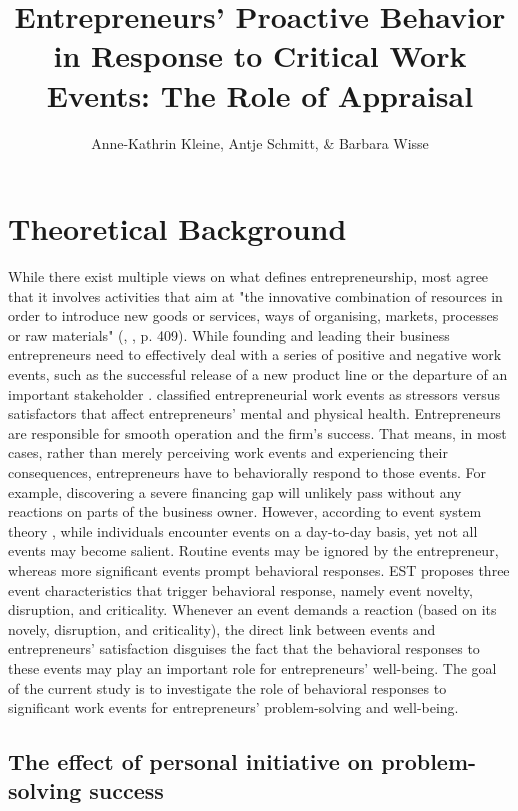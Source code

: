 \documentclass[man, 12pt, a4paper, noextraspace]{apa6}
\title{Entrepreneurs' Proactive Behavior in Response to Critical Work Events: The Role of Appraisal}
\author{Anne-Kathrin Kleine, Antje Schmitt, \& Barbara Wisse}
\affiliation{University of Groningen}
\begin{document}
\maketitle

\section{Theoretical Background}

While there exist multiple views on what defines entrepreneurship, most agree that it involves activities that aim at "the innovative combination of resources in order to introduce new goods or services, ways of organising, markets, processes or raw materials" (\citeauthor{Abreu2013}, \citeyear{Abreu2013}, p. 409).
While founding and leading their business entrepreneurs need to effectively deal with a series of positive and negative work events, such as the successful release of a new product line or the departure of an important stakeholder \parencite{Lechat2016, Schindehutte2006}.
\textcite{Lechat2016} classified entrepreneurial work events as stressors versus satisfactors that affect entrepreneurs' mental and physical health.
Entrepreneurs are responsible for smooth operation and the firm's success. 
That means, in most cases, rather than merely perceiving work events and experiencing their consequences, entrepreneurs have to behaviorally respond to those events.
For example, discovering a severe financing gap will unlikely pass without any reactions on parts of the business owner. 
However, according to event system theory \parencite[EST;][]{Morgeson2015}, while individuals encounter events on a day-to-day basis, yet not all events may become salient. 
Routine events may be ignored by the entrepreneur, whereas more significant events prompt behavioral responses.  
EST proposes three event characteristics that trigger behavioral response, namely event novelty, disruption, and criticality. 
Whenever an event demands a reaction (based on its novely, disruption, and criticality), the direct link between events and entrepreneurs' satisfaction disguises the fact that the behavioral responses to these events may play an important role for entrepreneurs' well-being. 
The goal of the current study is to investigate the role of behavioral responses to significant work events for entrepreneurs' problem-solving and well-being. \par 

\subsection{The effect of personal initiative on problem-solving success}
\end{document}
